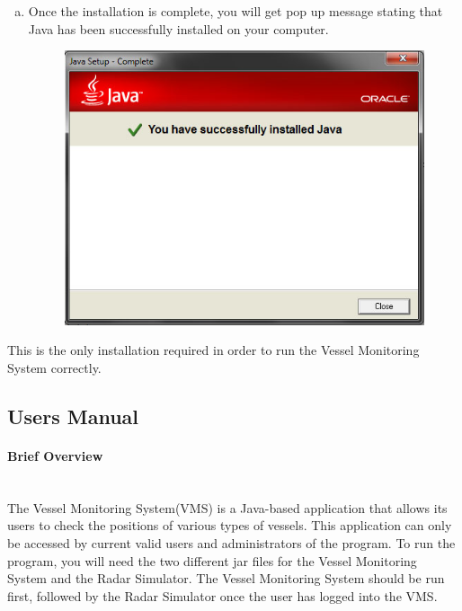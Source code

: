 \documentclass{article}
\begin{document}
\begin{enumerate}[(a)]
\begin{figure}[!htb]
	\end{figure}
  \item Once the installation is complete, you will get pop up message stating that Java has been successfully installed on your computer.
	\begin{figure}[!htb]
	\centering
	\includegraphics[scale=0.6]{images/javaInstall3.jpg}
	\end{figure}
\end{enumerate}

This is the only installation required in order to run the Vessel Monitoring System correctly.
\clearpage

{\color{royalblue}\subsection{Users Manual}}
\paragraph{Brief Overview \\ \\}

The Vessel Monitoring System(VMS) is a Java-based application that allows its users to check the positions of various types of vessels. This application can only be accessed by current valid users and administrators of the program. To run the program, you will need the two different jar files for the Vessel Monitoring System and the Radar Simulator. The Vessel Monitoring System should be run first, followed by the Radar Simulator once the user has logged into the VMS.
\end{document}
